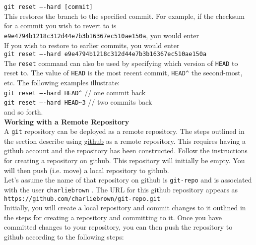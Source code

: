\documentclass[11pt]{article}
\begin{document}
{\tt git reset ----hard [commit]}\\

\noindent
This restores the branch to the specified commit. For example, if the checksum for a commit you wish to revert to is {\tt e9e4794b1218c312d44e7b3b16367ec510ae150a}, you would enter \\

\noindent
If you wish to restore to earlier commits, you would enter \\

{\tt git reset ----hard e9e4794b1218c312d44e7b3b16367ec510ae150a} \\

\noindent
The {\tt reset} command can also be used by specifying which version of {\tt HEAD} to reset to. The value of {\tt HEAD} is the most recent commit, {\tt HEAD\^{}} the second-most, etc. The following examples illustrate: \\

{\tt git reset ----hard HEAD\^{}} // one commit back \\ 

{\tt git reset ----hard HEAD\~{}3} // two commits back \\

\noindent
and so forth. \\
  
\noindent
{\bf Working with a Remote Repository} \\

\noindent
A {\tt git} repository can be deployed as a remote repository. The steps outlined in the section describe using \href{http://github.com}{github} as a remote repository. This requires  having a github account and the repository has been constructed. Follow the instructions for creating a repository on github. This repository will initially be empty. You will then push (i.e. move) a local repository to github.\\

\noindent
Let's assume the name of that repository on github is {\tt git-repo} and is associated with the user {\tt charliebrown} . The {\small URL} for this github repository appears as \\

{\tt https://github.com/charliebrown/git-repo.git} \\

\noindent
Initially, you will create a local repository and commit changes to it outlined in the steps for creating a repository and committing to it. Once you have committed changes to your repository, you can then push the repository to github according to the following steps: \\
\end{document}
